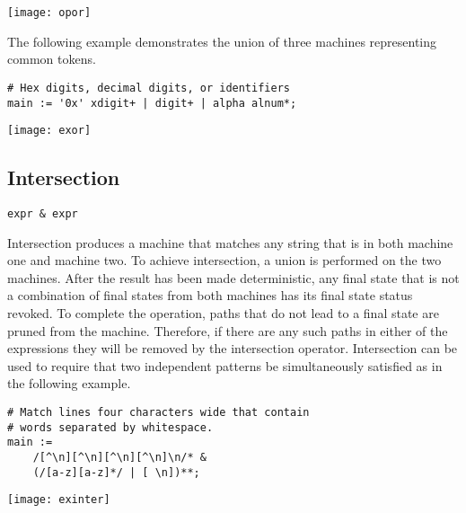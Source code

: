 \documentclass[letterpaper,11pt,oneside]{book}
\newcommand{\verbspace}{\vspace{10pt}}
\newcommand{\graphspace}{\vspace{10pt}}
\newenvironment{inline_code}{\def\baselinestretch{1}\vspace{12pt}\small}{}
\begin{document}
\graphspace
\begin{center}
\texttt{[image: opor]}
\end{center}
\graphspace

The following example demonstrates the union of three machines representing
common tokens.

\begin{inline_code}
\begin{verbatim}
# Hex digits, decimal digits, or identifiers
main := '0x' xdigit+ | digit+ | alpha alnum*;
\end{verbatim}
\end{inline_code}

\graphspace
\begin{center}
\texttt{[image: exor]}
\end{center}
\graphspace

\subsection{Intersection}

\verb|expr & expr|
\verbspace

Intersection produces a machine that matches any
string that is in both machine one and machine two. To achieve intersection, a
union is performed on the two machines. After the result has been made
deterministic, any final state that is not a combination of final states from
both machines has its final state status revoked. To complete the operation,
paths that do not lead to a final state are pruned from the machine. Therefore,
if there are any such paths in either of the expressions they will be removed
by the intersection operator.  Intersection can be used to require that two
independent patterns be simultaneously satisfied as in the following example.

\begin{inline_code}
\begin{verbatim}
# Match lines four characters wide that contain 
# words separated by whitespace.
main :=
    /[^\n][^\n][^\n][^\n]\n/* &
    (/[a-z][a-z]*/ | [ \n])**;
\end{verbatim}
\end{inline_code}

\graphspace
\begin{center}
\texttt{[image: exinter]}
\end{center}
\graphspace
\end{document}
